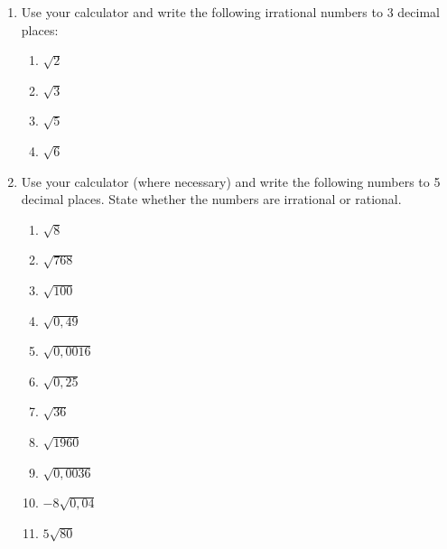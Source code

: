 \begin{enumerate}[noitemsep, label=\textbf{\arabic*}. ]
        \label{m38349*uid27}\item Use your calculator and write the following irrational numbers to 3 decimal places:
\label{m38349*id325991}\begin{enumerate}[noitemsep, label=\textbf{\alph*}. ] 
            \label{m38349*uid28}\item $\sqrt{2}$\label{m38349*uid29}\item \begin{math}\sqrt{3}\end{math}\label{m38349*uid30}\item \begin{math}\sqrt{5}\end{math}\label{m38349*uid31}\item \begin{math}\sqrt{6}\end{math}\end{enumerate}
        \label{m38349*uid32}\item Use your calculator (where necessary) and write the following numbers to 5 decimal places. State whether the numbers are irrational or rational.
\label{m38349*id326080}\begin{enumerate}[noitemsep, label=\textbf{\alph*}. ] 
            \label{m38349*uid33}\item $\sqrt{8}$\label{m38349*uid34}\item \begin{math}\sqrt{768}\end{math}\label{m38349*uid35}\item \begin{math}\sqrt{100}\end{math}\label{m38349*uid36}\item \begin{math}\sqrt{0,49}\end{math}\label{m38349*uid37}\item \begin{math}\sqrt{0,0016}\end{math}\label{m38349*uid38}\item \begin{math}\sqrt{0,25}\end{math}\label{m38349*uid39}\item \begin{math}\sqrt{36}\end{math}\label{m38349*uid40}\item \begin{math}\sqrt{1960}\end{math}\label{m38349*uid41}\item \begin{math}\sqrt{0,0036}\end{math}\label{m38349*uid42}\item \begin{math}-8\sqrt{0,04}\end{math}\label{m38349*uid43}\item \begin{math}5\sqrt{80}\end{math}\end{enumerate}

\end{enumerate}

